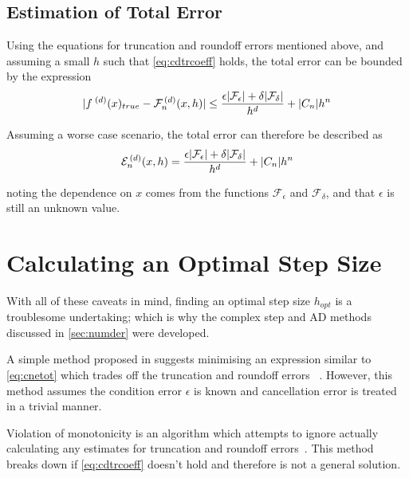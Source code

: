 \subsection{Estimation of Total Error}\label{subsec:cdtoterr}

Using the equations for truncation and roundoff errors mentioned above, and assuming a small $h$ such that \cref{eq:cdtrcoeff} holds, the total error can be bounded by the expression
\begin{equation}
\lvert f^{\;(d)}(x)_{true}-\mathcal{F}_n^{\,(d)}(x,h)\rvert \leq \frac{\epsilon\lvert\mathcal{F}_\epsilon\rvert+\delta\lvert\mathcal{F}_\delta\rvert}{h^d} + \lvert C_n\rvert h^n
\end{equation}

Assuming a worse case scenario, the total error can therefore be described as
\begin{equation}
\mathcal{E}_n^{\,(d)}(x,h) = \frac{\epsilon\lvert\mathcal{F}_\epsilon\rvert+\delta\lvert\mathcal{F}_\delta\rvert}{h^d} + \lvert C_n\rvert h^n\label{eq:cnetot}
\end{equation}

noting the dependence on $x$ comes from the functions $\mathcal{F}_\epsilon$ and $\mathcal{F}_\delta$, and that $\epsilon$ is still an unknown value.

\section[Optimal Step Size]{Calculating an Optimal Step Size}\label{sec:hopt}

With all of these caveats in mind, finding an optimal step size $h_{opt}$ is a troublesome undertaking; which is why the complex step and AD methods discussed in \cref{sec:numder} were developed.

A simple method proposed in \citeauthor{Gill1982} suggests minimising an expression similar to \cref{eq:cnetot} which trades off the truncation and roundoff errors ~\cite{Gill1982,Mathews2004}.
However, this method assumes the condition error $\epsilon$ is known and cancellation error is treated in a trivial manner.

Violation of monotonicity is an algorithm which attempts to ignore actually calculating any estimates for truncation and roundoff errors~\cite{Stepleman1979}. This method breaks down if \cref{eq:cdtrcoeff} doesn't hold and therefore is not a general solution.


